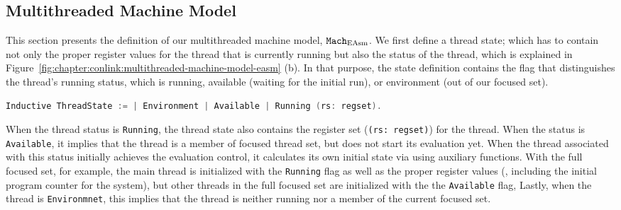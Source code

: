 \subsection{Multithreaded Machine Model}
\label{chapter:linking:subsec:multithreaded-machine-model}

This section presents the definition of our multithreaded machine model,
${\mathrm{\texttt{Mach}}}_{\mathrm{EAsm}}$.
We first define a thread state;
which has to contain not only the proper register values for the thread that is currently running  but also 
the status of the thread, which is explained in Figure~\ref{fig:chapter:conlink:multithreaded-machine-model-easm} (b).
In that purpose, the state definition contains the flag that distinguishes the thread's running status,
which is running, available (waiting  for the initial run), 
or environment (out of our focused set).
\begin{lstlisting}[language=C]
Inductive ThreadState := | Environment | Available | Running (rs: regset).
\end{lstlisting}
When the thread status is \lstinline$Running$, the thread state also contains the register set (\lstinline$(rs: regset)$) for the thread. 
%
When the status is \lstinline$Available$, it implies that the thread is a member of focused thread set, but does not start its evaluation 
yet.
When the thread associated with this status initially achieves the evaluation control, it calculates its own initial state via using 
auxiliary functions. 
With the full focused set, for example, the main thread is initialized with the \lstinline$Running$ flag as well as the proper register values (\ie, including the initial program counter for the system),
but other threads in the full focused set are initialized with the   the \lstinline$Available$ flag,
Lastly, when the thread is  \lstinline$Environmnet$, 
this implies that the thread is neither running nor a member of the current focused set. 
%


